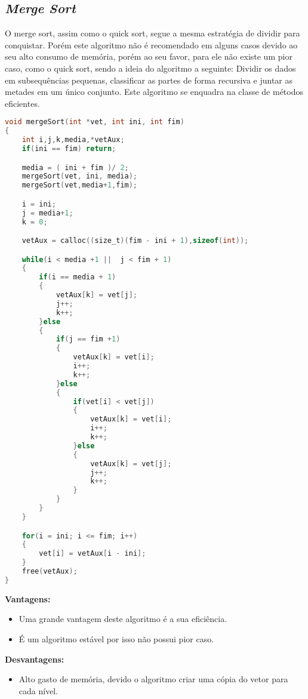 \documentclass[
	12pt,				%
	oneside,			%
	a4paper,			%
	english,			%
	brazil,				%
	]{article}
\begin{document}
\subsection{\textit{Merge Sort}}
O merge sort, assim como o quick sort, segue a mesma estratégia de dividir para conquistar. Porém este algoritmo não é recomendado em alguns casos devido ao 
seu alto consumo de memória, porém ao seu favor, para ele não existe um pior caso, como o quick sort, sendo a ideia do algoritmo a seguinte: Dividir os dados em 
subsequências pequenas, classificar as partes de forma recursiva e juntar as metades em um único conjunto. Este algoritmo se enquadra na classe de métodos eficientes.\cite{Merge}
\begin{lstlisting}[language=C, caption=Estrutura \textit{Merge}]
void mergeSort(int *vet, int ini, int fim)
{
	int i,j,k,media,*vetAux;
	if(ini == fim) return;

	media = ( ini + fim )/ 2;
	mergeSort(vet, ini, media);
	mergeSort(vet,media+1,fim);

	i = ini;
	j = media+1;
	k = 0;

	vetAux = calloc((size_t)(fim - ini + 1),sizeof(int));

	while(i < media +1 ||  j < fim + 1)
	{
		if(i == media + 1)
		{
			vetAux[k] = vet[j];
			j++;
			k++;
		}else
		{
			if(j == fim +1)
			{
				vetAux[k] = vet[i];
				i++;
				k++;
			}else
			{
				if(vet[i] < vet[j])
				{
					vetAux[k] = vet[i];
					i++;
					k++;
				}else
				{
					vetAux[k] = vet[j];
					j++;
					k++;
				}
			}
		}
	}

	for(i = ini; i <= fim; i++)
	{
		vet[i] = vetAux[i - ini];
	}
	free(vetAux);
}
\end{lstlisting}
\textbf{Vantagens:}
\begin{itemize}
 \item Uma grande vantagem deste algoritmo é a sua eficiência.
 \item É um algoritmo estável por isso não possui pior caso.
\end{itemize}
\textbf{Desvantagens:}
\begin{itemize}
 \item Alto gasto de memória, devido o algoritmo criar uma cópia do vetor para cada nível.
\end{itemize}
\end{document}
